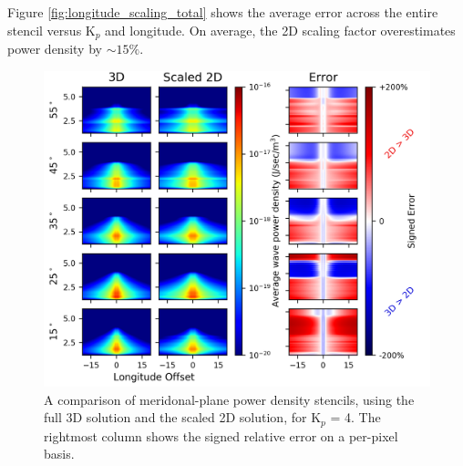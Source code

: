 Figure \ref{fig:longitude_scaling_total} shows the average error across the entire stencil versus K$_p$ and longitude. On average, the 2D scaling factor overestimates power density by $\sim 15\%$.
\begin{figure}[h!]
\begin{center}
\includegraphics{figures/rel_error_grid_2d3d.png}
\caption[Difference between 2d and 3d longitude scaling]{A comparison of meridonal-plane power density stencils, using the full 3D solution and the scaled 2D solution, for K$_p$ = 4. The rightmost column shows the signed relative error on a per-pixel basis.}
\label{fig:longitude_scaling_2d_vs_3d}
\end{center}
\end{figure}

